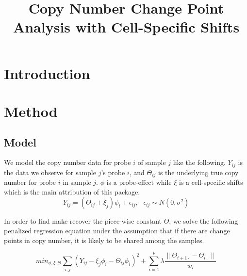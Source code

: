 \documentclass[11pt]{article}
\title{Copy Number Change Point Analysis with Cell-Specific Shifts}
\begin{document}
\maketitle
\section{Introduction}

\section{Method}
\subsection{Model}
\noindent We model the copy number data for probe $i$ of sample $j$ like the following. $Y_{ij}$ is the data we observe for sample $j$'s probe $i$, and $\Theta_{ij}$ is the underlying true copy number for probe $i$ in sample $j$. $\phi$ is a probe-effect while $\xi$ is a cell-specific shifts which is the main attribution of this package. 
\begin{equation}
Y_{ij} = (\Theta_{ij}+\xi_j)\phi_i + \epsilon_{ij}, \text{  } \epsilon_{ij} \sim N(0, \sigma^2)
\end{equation}

\noindent In order to find make recover the piece-wise constant $\Theta$, we solve the following penalized regression equation under the assumption that if there are change points in copy number, it is likely to be shared among the samples. 

\begin{equation}
min_{\phi, \xi, \Theta} \sum_{i,j} (Y_{ij} - \xi_j \phi_i -  \Theta_{ij} \phi_i)^2 + \sum_{i=1}^p \lambda \frac{\|\Theta_{i+1\cdot} - \Theta_{i\cdot}  \|}{w_i}
\end{equation}
\end{document}
